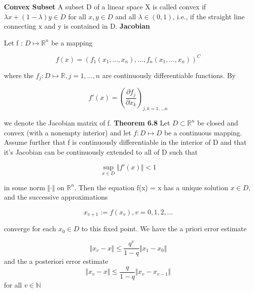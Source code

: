 \documentclass[a4paper]{article}
\begin{document}
\begin{framed}

\textbf{Convex Subset} A subset D of a linear space X is called convex if $ \lambda x + ( 1 - \lambda ) y \in D $ for all $ x,y \in D $ and all $ \lambda \in (0,1)$, i.e., if the
straight line connecting x and y is contained in D. 
\newline \newline
[...]
\newline \newline
\textbf{Jacobian} 

Let f : $ D \mapsto \mathbb{R}^n $ be a mapping

$$
f(x) = (f_1(x_1, ..., x_n), ..., f_n(x_1,...,x_n))^C
$$

where the $ f_j : D \mapsto \mathbb{R}, j = 1, ..., n $ are continuously differentiable functions. By 

$$
f'(x) = \left( \frac{\partial f_j}{\partial x_k}  \right)_{j,k=1,...n}
$$

we denote the Jacobian matrix of f.
\newline \newline
[...]
\newline \newline
\textbf{Theorem 6.8} Let $ D \subset \mathbb{R}^n $ be closed and convex (with a nonempty interior) and let $ f : D \mapsto D $ be a continuous mapping. Assume further that f is
continuously differentiable in the interior of D and that it's Jacobian can be continuously extended to all of D such that

$$
\sup_{x \in D} \Vert f'(x)\Vert < 1
$$

in some norm $ \Vert \cdot \Vert $ on $ \mathbb{R}^n $. Then the equation f(x) = x has a unique solution $ x \in D$, and the successive approximations 

$$
 x_{v+1} := f(x_v),  v = 0,1,2,...
$$

converge for each $ x_0 \in D $ to this fixed point. We have the a priori error estimate 

$$
\Vert x_v - x \Vert \leq \frac{q^v}{1-q} \Vert x_1 - x_0 \Vert
$$
and the a posteriori error estimate
$$
\Vert x_v - x \Vert \leq \frac{q}{1-q} \Vert x_v - x_{v-1} \Vert
$$
for all $ v \in \mathbb{N} $

\end{framed}
\end{document}
